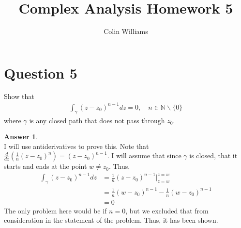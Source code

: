 \documentclass[10pt,a4paper]{article}
\title{Complex Analysis Homework 5}
\author{Colin Williams}
\theoremstyle{definition}
\newtheorem*{answer*}{Answer}
\begin{document}
\maketitle

\section*{Question 5}
Show that 
\begin{align*}
\int_{\gamma} (z - z_0)^{n - 1} dz = 0, \quad n \in \mathbb{N} \backslash \{0\}
\end{align*}
where $\gamma$ is any closed path that does not pass through $z_0$.

\begin{answer*}{$ $}
\\I will use antiderivatives to prove this. Note that $\displaystyle \frac{d}{dz}\left(\frac{1}{n}(z - z_0)^n\right) = (z - z_0)^{n - 1}$. I will assume that since $\gamma$ is closed, that it starts and ends at the point $w \neq z_0$. Thus, 
\begin{align*}
\int_{\gamma} (z - z_0)^{n-1}dz &= \frac{1}{n}(z - z_0)^{n - 1} \Big|_{z = w}^{z = w}\\
&= \frac{1}{n}(w - z_0)^{n - 1} - \frac{1}{n}(w - z_0)^{n - 1}\\
&= 0
\end{align*}
The only problem here would be if $n = 0$, but we excluded that from consideration in the statement of the problem. Thus, it has been shown. 
\end{answer*}
\end{document}
